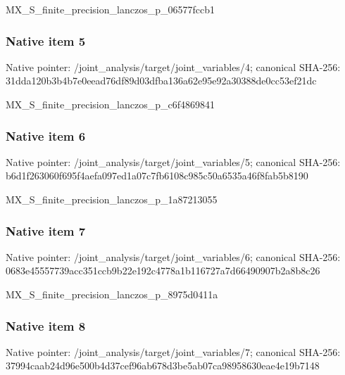 \documentclass[10pt,a4paper]{article}
\begin{document}
\begingroup\raggedright\sloppy MX\_\allowbreak{}S\_\allowbreak{}finite\_\allowbreak{}precision\_\allowbreak{}lanczos\_\allowbreak{}p\_\allowbreak{}06577fccb1\par\endgroup

\subsubsection{Native item 5}
Native pointer: /joint\_\allowbreak{}analysis/target/joint\_\allowbreak{}variables/4; canonical SHA-256: 31dda120b3b4b7e0eead76df89d03dfba136a62e95e92a30388de0cc53ef21dc

\begingroup\raggedright\sloppy MX\_\allowbreak{}S\_\allowbreak{}finite\_\allowbreak{}precision\_\allowbreak{}lanczos\_\allowbreak{}p\_\allowbreak{}c6f4869841\par\endgroup

\subsubsection{Native item 6}
Native pointer: /joint\_\allowbreak{}analysis/target/joint\_\allowbreak{}variables/5; canonical SHA-256: b6d1f263060f695f4aefa097ed1a07c7fb6108c985c50a6535a46f8fab5b8190

\begingroup\raggedright\sloppy MX\_\allowbreak{}S\_\allowbreak{}finite\_\allowbreak{}precision\_\allowbreak{}lanczos\_\allowbreak{}p\_\allowbreak{}1a87213055\par\endgroup

\subsubsection{Native item 7}
Native pointer: /joint\_\allowbreak{}analysis/target/joint\_\allowbreak{}variables/6; canonical SHA-256: 0683e45557739acc351ccb9b22e192c4778a1b116727a7d66490907b2a8b8c26

\begingroup\raggedright\sloppy MX\_\allowbreak{}S\_\allowbreak{}finite\_\allowbreak{}precision\_\allowbreak{}lanczos\_\allowbreak{}p\_\allowbreak{}8975d0411a\par\endgroup

\subsubsection{Native item 8}
Native pointer: /joint\_\allowbreak{}analysis/target/joint\_\allowbreak{}variables/7; canonical SHA-256: 37994caab24d96e500b4d37cef96ab678d3be5ab07ca98958630eae4e19b7148
\end{document}
